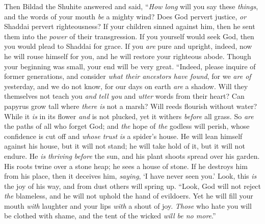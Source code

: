 \begin{biblechapter} %
 Then Bildad the Shuhite answered and said,
\verse “\textit{How long} will you say these \textit{things}, 
and the words of your mouth \textit{be} a mighty wind?
\verse Does God pervert justice, 
\textit{or} Shaddai pervert righteousness?
\verse If your children sinned against him, 
then he sent them into the \textit{power} of their transgression.
\verse If you yourself would seek God, 
then you would plead to Shaddai for grace.
\verse If you \textit{are} pure and upright, 
indeed, now he will rouse himself for you, 
and he will restore your righteous abode.
\verse Though your beginning was small, 
your end will be very great.
\verse “Indeed, please inquire of former generations, 
and consider \textit{what their ancestors have found},
\verse for we \textit{are of} yesterday, and we do not know, 
for our days on earth \textit{are} a shadow.
\verse Will they themselves not teach you \textit{and} \textit{tell you} 
and \textit{utter} words from their heart?
\verse Can papyrus grow tall where \textit{there is} not a marsh? 
Will reeds flourish without water?
\verse While it \textit{is} in its flower \textit{and} is not plucked, 
yet it withers \textit{before} all grass.
\verse So \textit{are} the paths of all who forget God; 
and \textit{the} hope of \textit{the} godless will perish,
\verse whose confidence is cut off 
and \textit{whose trust} \textit{is} a spider’s house.
\verse He will lean himself against his house, but it will not stand; 
he will take hold of it, but it will not endure.
\verse He \textit{is} \textit{thriving} \textit{before} the sun, 
and his plant shoots spread over his garden.
\verse His roots twine over a stone heap; 
he sees a house of stone.
\verse If he destroys him from his place, 
then it deceives him, \textit{saying}, ‘I have never seen you.’
\verse Look, this \textit{is} the joy of his way, 
and from dust others will spring up.
\verse “Look, God will not reject \textit{the} blameless, 
and he will not uphold the hand of evildoers.
\verse Yet he will fill your mouth \textit{with} laughter 
and your lips \textit{with} a shout of joy.
\verse \textit{Those} who hate you will be clothed with shame, 
and the tent of the wicked \textit{will be no more}.”
\end{biblechapter}

